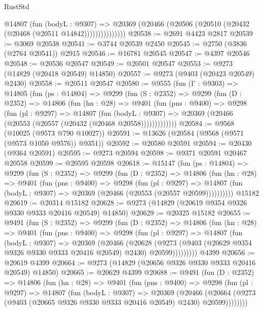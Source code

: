 \begin{lexlean}{RustStd}
\begin{coremodule}
{\begin{coremodule}
{{{{{{{{{{{{{{{{{{{{{{{{{{{{{{{{{{{{{{{{{{{{{{{{{{{{{{{                  @14807
                    (fun (bodyL : @9307) =>
                    @20369 (@20466 (@20506 (@20510 (@20432 (@20468 (@20511 @14842)))))))))))))))
@20538 := @2691 @4423 @2817
@20539 := @3069 @20538
@20541 := @3744 @20539 @2450
@20545 := @2750 (@3836 (@2764 @20541)) @2915
@20546 := @16781 @20545
@20547 := @4397 @20546
@20548 := @20536 @20547
@20549 := @20501 @20547
@20553 := @9273 (@14829 (@20418 @20549) @14850)
@20557 := @9273 (@9403 (@20423 @20549) @2430)
@20558 := @20511 @20547
@20580 := @9555
    (fun (Γ : @9303) =>
    @14805
      (fun (ps : @14804) =>
      @9299
        (fun (S : @2352) =>
        @9299
          (fun (D : @2352) =>
          @14806
            (fun (hn : @28) =>
            @9401
              (fun (pns : @9400) =>
              @9298
                (fun (pl : @9297) =>
                @14807
                  (fun (bodyL : @9307) =>
                  @20369 (@20466 (@20553 (@20557 (@20432 (@20468 @20558)))))))))))))
@20584 := @9568 (@10025 (@9573 @790 @10027))
@20591 := @13626 (@20584 (@9568 (@9571 (@9573 @1050 @9576)) @9351))
@20592 := @20580 @20591
@20594 := @20430 (@9364 @20591)
@20595 := @9273 @20594
@20598 := @9371 @20591 @20467 @20558
@20599 := @20595 @20598
@20618 := @15147
    (fun (ps : @14804) =>
    @9299
      (fun (S : @2352) =>
      @9299
        (fun (D : @2352) =>
        @14806
          (fun (hn : @28) =>
          @9401
            (fun (pns : @9400) =>
            @9298
              (fun (pl : @9297) =>
              @14807 (fun (bodyL : @9307) => @20369 (@20466 (@20553 (@20557 @20599))))))))))
    @15182
@20619 := @20314 @15182
@20628 := @9273 (@14829 (@20619 @9354 @9326 @9330 @9333 @20416 @20549) @14850)
@20629 := @20325 @15182
@20655 := @9491
    (fun (S : @2352) =>
    @9299
      (fun (D : @2352) =>
      @14806
        (fun (hn : @28) =>
        @9401
          (fun (pns : @9400) =>
          @9298
            (fun (pl : @9297) =>
            @14807
              (fun (bodyL : @9307) =>
              @20369
                (@20466
                  (@20628
                    (@9273
                      (@9403 (@20629 @9354 @9326 @9330 @9333 @20416 @20549) @2430)
                      @20599)))))))))
    @4399
@20656 := @20619 @4399
@20664 := @9273 (@14829 (@20656 @9326 @9330 @9333 @20416 @20549) @14850)
@20665 := @20629 @4399
@20688 := @9491
    (fun (D : @2352) =>
    @14806
      (fun (hn : @28) =>
      @9401
        (fun (pns : @9400) =>
        @9298
          (fun (pl : @9297) =>
          @14807
            (fun (bodyL : @9307) =>
            @20369
              (@20466
                (@20664 (@9273 (@9403 (@20665 @9326 @9330 @9333 @20416 @20549) @2430) @20599))))))))
}}}}}}}}}}}}}}}}}}}}}}}}}}}}}}}}}}}}}}}}}}}}}}}}}}}}}}}
\end{coremodule}}
\end{coremodule}
\end{lexlean}
